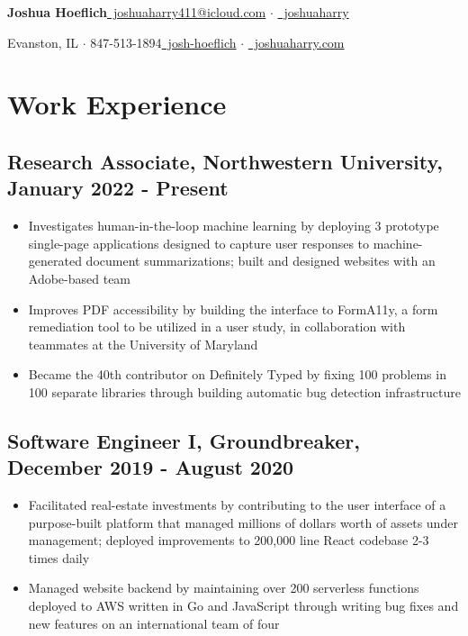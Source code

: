 \documentclass[letterpaper]{article}
\newcommand{\bigdot}{{\large $\cdot$ }}
\begin{document}
{\Large \textbf{Joshua Hoeflich}}\hfill \href{mailto:joshuahoeflich2021@u.northwestern.edu}{{\small \faEnvelope}~joshuaharry411@icloud.com} \bigdot
\href{https://github.com/joshuaharry}{{\small \faGithub}~joshuaharry}

{\normalsize Evanston, IL $\cdot$ 847-513-1894}\hfill \href{https://www.linkedin.com/in/josh-hoeflich/}{{\small \faLinkedinSquare}~josh-hoeflich} $\cdot$ \href{https://joshuaharry.com}{{\small \faGlobe}~joshuaharry.com}
\section*{Work Experience}
\subsection*{Research Associate, Northwestern University, January 2022 - Present}
\begin{itemize}
\item Investigates human-in-the-loop machine learning by deploying 3 prototype single-page applications designed to capture user responses to machine-generated document summarizations; built and designed websites with an Adobe-based team
\item Improves PDF accessibility by building the interface to FormA11y, a form remediation tool to be utilized in a user study, in collaboration with teammates at the University of Maryland
\item Became the 40th contributor on Definitely Typed by fixing 100 problems in 100 separate libraries through building automatic bug detection infrastructure
\end{itemize}
\subsection*{Software Engineer I, Groundbreaker, December 2019 - August 2020}
\begin{itemize}
\item Facilitated real-estate investments by contributing to the user interface of a purpose-built platform that managed millions of dollars worth of assets under management; deployed improvements to 200,000 line React codebase 2-3 times daily

\item Managed website backend by maintaining over 200 serverless functions deployed to AWS written in Go and JavaScript through writing bug fixes and new features on an international team of four
\end{itemize}
\end{document}
